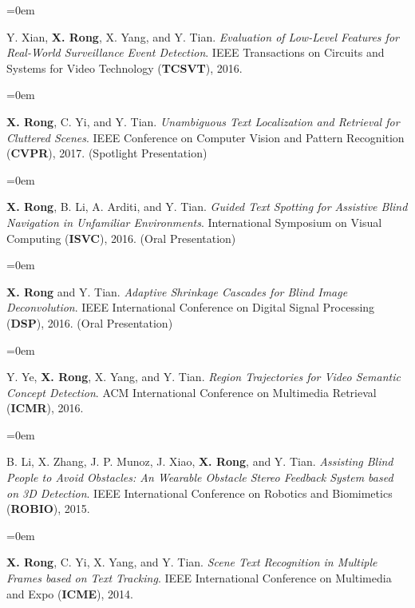 \documentclass{scrartcl}
\newcommand{\Description}[1]{\hangindent=0em\hangafter=0\noindent\raggedright\footnotesize{#1}\par\normalsize\vspace{1em}} %
\begin{document}
\begin{cv}{}
\noindent{}\vspace{0.5em}

\Description{Y. Xian, \textbf{X. Rong}, X. Yang, and Y. Tian. \textit{Evaluation of Low-Level Features for Real-World Surveillance Event Detection}. IEEE Transactions on Circuits and Systems for Video Technology (\textbf{TCSVT}), 2016.}

\vspace{0.5em} %

\noindent{}\vspace{0.5em}

\Description{\textbf{X. Rong}, C. Yi, and Y. Tian. \textit{Unambiguous Text Localization and Retrieval for Cluttered Scenes}. IEEE Conference on Computer Vision and Pattern Recognition (\textbf{CVPR}), 2017. (Spotlight Presentation)}

\Description{\textbf{X. Rong}, B. Li, A. Arditi, and Y. Tian. \textit{Guided Text Spotting for Assistive Blind Navigation in Unfamiliar Environments}. International Symposium on Visual Computing (\textbf{ISVC}), 2016. (Oral Presentation)}

\Description{\textbf{X. Rong} and Y. Tian. \textit{Adaptive Shrinkage Cascades for Blind Image Deconvolution}. IEEE International Conference on Digital Signal Processing (\textbf{DSP}), 2016. (Oral Presentation)}

\Description{Y. Ye, \textbf{X. Rong}, X. Yang, and Y. Tian. \textit{Region Trajectories for Video Semantic Concept Detection}. ACM International Conference on Multimedia Retrieval (\textbf{ICMR}), 2016.}

\Description{B. Li, X. Zhang, J. P. Munoz, J. Xiao, \textbf{X. Rong}, and Y. Tian. \textit{Assisting Blind People to Avoid Obstacles: An Wearable Obstacle Stereo Feedback System based on 3D Detection}. IEEE International Conference on Robotics and Biomimetics (\textbf{ROBIO}), 2015.}

\Description{\textbf{X. Rong}, C. Yi, X. Yang, and Y. Tian. \textit{Scene Text Recognition in Multiple Frames based on Text Tracking}. IEEE International Conference on Multimedia and Expo (\textbf{ICME}), 2014.}


\end{cv}
\end{document}
